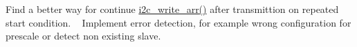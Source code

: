 
\begin{DoxyRefList}
\item[\label{todo__todo000001}%
\hypertarget{todo__todo000001}{}%
Datei \hyperlink{i2c_8h}{i2c.h} ]Find a better way for continue \hyperlink{i2c_8h_ae0625b97d3437bcaca4ac4b96dd01978}{i2c\+\_\+write\+\_\+arr()} after transmittion on repeated start condition. ~\newline
 Implement error detection, for example wrong configuration for prescale or detect non existing slave.
\end{DoxyRefList}